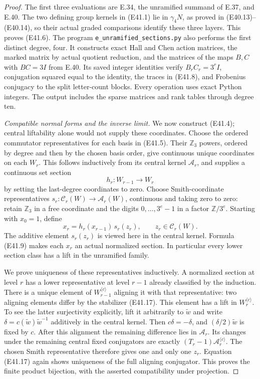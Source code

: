 \begin{proof}
The first three evaluations are E.34, the
unramified summand of E.37, and E.40. The two
defining group kernels in (E41.1) lie in
$\gamma_4N$, as proved in (E40.13)--(E40.14),
so their actual graded comparisons identify
these three layers. This proves (E41.6).
The program \texttt{e\_unramified\_sections.py}
also performs the first distinct degree, four.
It constructs exact Hall and Chen action
matrices, the marked matrix by actual quotient
reduction, and the matrices of the maps
$B,C$ with $BC=3I$ from E.40.
Its saved integer identities verify
$B_rC_r=3^rI$, conjugation squared equal to the
identity, the traces in (E41.8), and Frobenius
conjugacy to the split letter-count blocks.
Every operation uses exact Python integers.
The output includes the sparse matrices and
rank tables through degree ten.

\emph{Compatible normal forms and the inverse limit.}
We now construct (E41.4); central liftability
alone would not supply these coordinates.
Choose the ordered commutator representatives
for each basis in (E41.5). Their $\mathbb Z_3$
powers, ordered by degree and then by the
chosen basis order, give continuous unique
coordinates on each $W_r$. This follows
inductively from its central kernel
$\mathcal A_r$, and supplies a continuous set
section
\[
 h_r:W_{r-1}\longrightarrow W_r
\]
by setting the last-degree coordinates to zero.
Choose Smith-coordinate representatives
$s_r:\mathcal C_r(W)\to\mathcal A_r(W)$,
continuous and taking zero to zero: retain
$\mathbb Z_3$ in a free coordinate and the
digits $0,\ldots,3^e-1$ in a factor
$\mathbb Z/3^e$. Starting with $x_0=1$, define
\[
 x_r=h_r(x_{r-1})\,s_r(z_r),
       \qquad z_r\in\mathcal C_r(W).
 \tag{E41.21}
\]
The additive element $s_r(z_r)$ is viewed here
in the central kernel. Formula (E41.9) makes
each $x_r$ an actual normalized section.
In particular every lower section class has
a lift in the unramified family.

We prove uniqueness of these representatives
inductively. A normalized section at level
$r$ has a lower representative at level
$r-1$ already classified by the induction.
There is a unique element of
$W_{r-1}^{\langle c\rangle}$ aligning it
with that representative: two aligning
elements differ by the stabilizer (E41.17).
This element has a lift in
$W_r^{\langle c\rangle}$. To see the latter
surjectivity explicitly, lift it arbitrarily
to $\widetilde w$ and write
$\delta=c(\widetilde w)\widetilde w^{-1}$
additively in the central kernel. Then
$c\delta=-\delta$, and
$(\delta/2)\widetilde w$ is fixed by $c$.
After this alignment the
remaining difference lies in $\mathcal A_r$.
Its changes under the remaining central
fixed conjugators are exactly
$(T_r-1)\mathcal A_r^{\langle c\rangle}$.
The chosen Smith representative therefore
gives one and only one $z_r$. Equation
(E41.17) again shows uniqueness of the full
aligning conjugator. This proves the finite
product bijection, with the asserted
compatibility under projection.


\end{proof}
